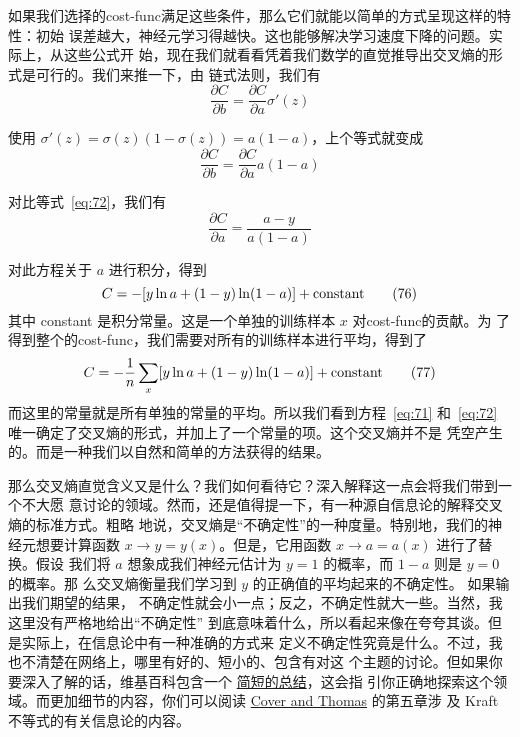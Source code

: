 如果我们选择的\gls*{cost-func}满足这些条件，那么它们就能以简单的方式呈现这样的特性：初始
误差越大，神经元学习得越快。这也能够解决学习速度下降的问题。实际上，从这些公式开
始，现在我们就看看凭着我们数学的直觉推导出交叉熵的形式是可行的。我们来推一下，由
链式法则，我们有
\begin{equation}
  \frac{\partial C}{\partial b} = \frac{\partial C}{\partial a}
  \sigma'(z)
  \tag{73}
\end{equation}

使用 $\sigma'(z) = \sigma(z)(1-\sigma(z)) = a(1-a)$，上个等式就变成
\begin{equation}
  \frac{\partial C}{\partial b} = \frac{\partial C}{\partial a}
  a(1-a)
  \label{eq:74}\tag{74}
\end{equation}

对比等式~\eqref{eq:72}，我们有
\begin{equation}
  \frac{\partial C}{\partial a} = \frac{a-y}{a(1-a)}
  \label{eq:75}\tag{75}
\end{equation}

对此方程关于 $a$ 进行积分，得到
\begin{equation}
  C = -[y \ln a + (1-y) \ln (1-a)]+ {\rm constant}
  \label{eq:76}\tag{76}
\end{equation}
其中 {\rm constant} 是积分常量。这是一个单独的训练样本 $x$ 对\gls*{cost-func}的贡献。为
了得到整个的\gls*{cost-func}，我们需要对所有的训练样本进行平均，得到了
\begin{equation}
  C = -\frac{1}{n} \sum_x [y \ln a +(1-y) \ln(1-a)] + {\rm constant}
  \label{eq:77}\tag{77}
\end{equation}
而这里的常量就是所有单独的常量的平均。所以我们看到方程~\eqref{eq:71}
和~\eqref{eq:72} 唯一确定了交叉熵的形式，并加上了一个常量的项。这个交叉熵并不是
凭空产生的。而是一种我们以自然和简单的方法获得的结果。

那么交叉熵直觉含义又是什么？我们如何看待它？深入解释这一点会将我们带到一个不大愿
意讨论的领域。然而，还是值得提一下，有一种源自信息论的解释交叉熵的标准方式。粗略
地说，交叉熵是“不确定性”的一种度量。特别地，我们的神经元想要计算函数 $x
\rightarrow y = y(x)$。但是，它用函数 $x \rightarrow a = a(x)$ 进行了替换。假设
我们将 $a$ 想象成我们神经元估计为 $y = 1$ 的概率，而 $1-a$ 则是 $y=0$ 的概率。那
么交叉熵衡量我们学习到 $y$ 的正确值的平均起来的不确定性。 如果输出我们期望的结果，
不确定性就会小一点；反之，不确定性就大一些。当然，我这里没有严格地给出“不确定性”
到底意味着什么，所以看起来像在夸夸其谈。但是实际上，在信息论中有一种准确的方式来
定义不确定性究竟是什么。不过，我也不清楚在网络上，哪里有好的、短小的、包含有对这
个主题的讨论。但如果你要深入了解的话，维基百科包含一个%
\href{http://en.wikipedia.org/wiki/Cross_entropy#Motivation}{简短的总结}，这会指
引你正确地探索这个领域。而更加细节的内容，你们可以阅读
\href{http://books.google.ca/books?id=VWq5GG6ycxMC}{Cover and Thomas} 的第五章涉
及 Kraft 不等式的有关信息论的内容。

